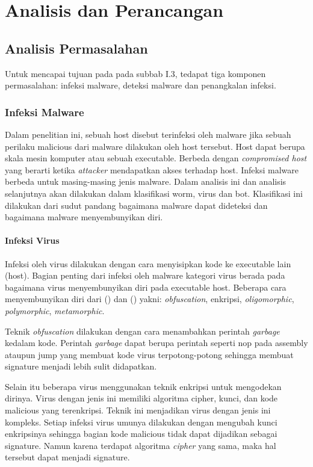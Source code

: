 \chapter{Analisis dan Perancangan}

\section{Analisis Permasalahan}
Untuk mencapai tujuan pada pada subbab I.3, tedapat tiga komponen permasalahan: infeksi malware, deteksi malware dan penangkalan infeksi.

\subsection{Infeksi Malware}
Dalam penelitian ini, sebuah host disebut terinfeksi oleh malware jika sebuah perilaku malicious dari malware dilakukan oleh host tersebut. Host dapat berupa skala mesin komputer atau sebuah executable. Berbeda dengan \textit{compromised host} yang berarti ketika \textit{attacker} mendapatkan akses terhadap host. Infeksi malware berbeda untuk masing-masing jenis malware. Dalam analisis ini dan analisis selanjutnya akan dilakukan dalam klasifikasi worm, virus dan bot. Klasifikasi ini dilakukan dari sudut pandang bagaimana malware dapat dideteksi dan bagaimana malware menyembunyikan diri.

\subsubsection{Infeksi Virus}

Infeksi oleh virus dilakukan dengan cara menyisipkan kode ke executable lain (host). Bagian penting dari infeksi oleh malware kategori virus berada pada bagaimana virus menyembunyikan diri pada executable host. Beberapa cara menyembunyikan diri dari (\cite{6620049}) dan (\cite{alsamer2016}) yakni: \textit{obfuscation}, enkripsi, \textit{oligomorphic}, \textit{polymorphic}, \textit{metamorphic}.

Teknik \textit{obfuscation} dilakukan dengan cara menambahkan perintah \textit{garbage} kedalam kode. Perintah \textit{garbage} dapat berupa perintah seperti nop pada assembly ataupun jump yang membuat kode virus terpotong-potong sehingga membuat signature menjadi lebih sulit didapatkan.

Selain itu beberapa virus menggunakan teknik enkripsi untuk mengodekan dirinya. Virus dengan jenis ini memiliki algoritma cipher, kunci, dan kode malicious yang terenkripsi. Teknik ini menjadikan virus dengan jenis ini kompleks. Setiap infeksi virus umunya dilakukan dengan mengubah kunci enkripsinya sehingga bagian kode malicious tidak dapat dijadikan sebagai signature. Namun karena terdapat algoritma \textit{cipher} yang sama, maka hal tersebut dapat menjadi signature.

